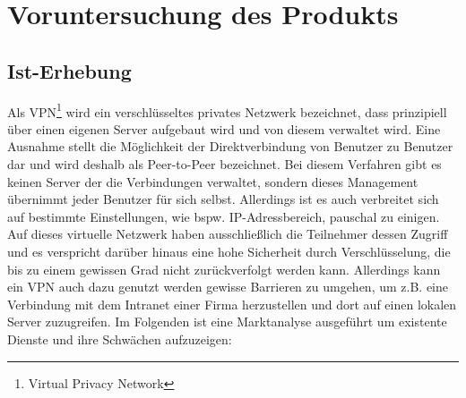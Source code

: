 \documentclass[a4paper,12pt]{scrreprt}
\begin{document}
\chapter{Voruntersuchung des Produkts}
	\section{Ist-Erhebung}
	
	Als VPN\footnote{Virtual Privacy Network} wird ein verschlüsseltes privates Netzwerk bezeichnet, dass prinzipiell über einen eigenen Server aufgebaut wird und von diesem verwaltet wird. Eine Ausnahme stellt die Möglichkeit der Direktverbindung von Benutzer zu Benutzer dar und wird deshalb als Peer-to-Peer bezeichnet. Bei diesem Verfahren gibt es keinen Server der die Verbindungen verwaltet, sondern dieses Management übernimmt jeder Benutzer für sich selbst. Allerdings ist es auch verbreitet sich auf bestimmte Einstellungen, wie bspw. IP-Adressbereich, pauschal zu einigen. Auf dieses virtuelle Netzwerk haben ausschließlich die Teilnehmer dessen Zugriff und es verspricht darüber hinaus eine hohe Sicherheit durch Verschlüsselung, die bis zu einem gewissen Grad nicht zurückverfolgt werden kann. Allerdings kann ein VPN auch dazu genutzt werden gewisse Barrieren zu umgehen, um z.B. eine Verbindung mit dem Intranet einer Firma herzustellen und dort auf einen lokalen Server zuzugreifen. Im Folgenden ist eine Marktanalyse ausgeführt um existente Dienste und ihre Schwächen aufzuzeigen:
	
\end{document}
